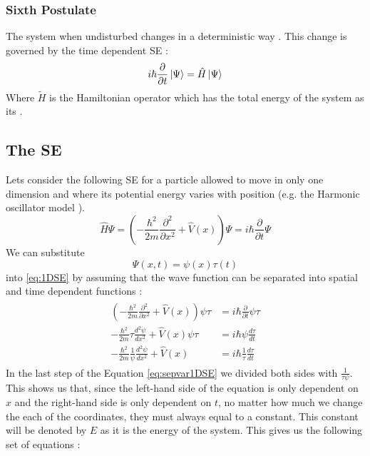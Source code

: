 \documentclass[../master_thesis.tex]{subfiles}
\begin{document}
\subsubsection{Sixth Postulate}
The system when undisturbed changes in a deterministic way \cite{Cohen:1973}.
This change is governed by the time dependent \ac{SE} \cite{Cohen:1973, Atkins:2011}:
\begin{equation}\label{eq:tdepSE}
  i\hbar\frac{\partial}{\partial t} \ket{\Psi} = \hat{H}\ket{\Psi}
\end{equation}
Where $\tilde{H}$ is the Hamiltonian operator which has the total energy of the
system as its \eivals.

\subsection{The \ac{SE}}
Lets consider the following \ac{SE} for a particle allowed to move in only one dimension
and where its potential energy varies with position (e.g. the Harmonic oscillator
model \cite{Cohen:1973, Atkins:2014}).
\begin{equation}
  \hat{H}\Psi = \left(-\frac{\hbar^2}{2m}\frac{\partial^2 }{\partial x^2} + \hat{V}(x)\right)\Psi = i\hbar\frac{\partial}{\partial t} \Psi\label{eq:1DSE}
\end{equation}
We can substitute $$\Psi(x, t)=\psi(x)\tau(t)$$ into \ref{eq:1DSE}
by assuming that the wave function can be separated into spatial and time dependent
functions \cite{Atkins:2011}:
\begin{align}
  \begin{split}\label{eq:sepvar1DSE}
    \left(-\frac{\hbar^2}{2m}\frac{\partial^2 }{\partial x^2} + \hat{V}(x)\right)\psi\tau &= i\hbar\frac{\partial}{\partial t} \psi\tau \\
    -\frac{\hbar^2}{2m}\tau\frac{d^2 \psi}{d x^2} + \hat{V}(x)\psi\tau &= i\hbar\psi\frac{d\tau}{d t}\\
    -\frac{\hbar^2}{2m}\frac{1}{\psi}\frac{d^2\psi }{d x^2} + \hat{V}(x) &= i\hbar\frac{1}{\tau}\frac{d\tau}{d t}
  \end{split}
\end{align}
In the last step of the Equation \ref{eq:sepvar1DSE} we divided both sides with $\frac{1}{\tau\psi}$.
This shows us that, since the left-hand side of the equation is only dependent on $x$ and the right-hand
side is only dependent on $t$, no matter how much we change the each of the coordinates, they must always equal to
a constant. This constant will be denoted by $E$ as it is the energy of the system. This gives us the following set of equations \cite{Atkins:2011}:
\end{document}
